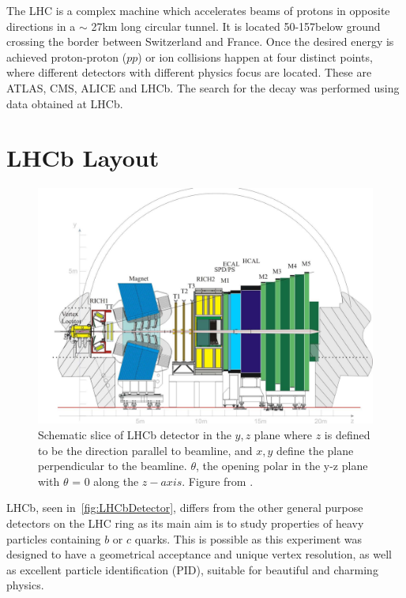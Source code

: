 The \Gls{LHC} is a complex machine which accelerates beams of protons in opposite directions in a $\sim$ 27km long circular tunnel. It is located
50-157\m below ground crossing the border between Switzerland and France. Once the desired energy is achieved proton-proton ($pp$) or ion collisions happen at four distinct points, where different detectors with different physics focus are located. These are \Gls{ATLAS}, \Gls{CMS}, \Gls{ALICE} and \Gls{LHCb}. 
The search for the decay \Bmumumu was performed using data obtained at \Gls{LHCb}\cite{det_paper}. 

\section{LHCb Layout }

\begin{figure}
	\centering
	\includegraphics[scale = 0.25]{figs/detector/lhcbdet.pdf}
	\caption{Schematic slice of \Gls{LHCb} detector in the $y,z$ plane where $z$ is defined to be the direction parallel to beamline, and $x,y$ define the plane perpendicular to the beamline. $\theta$, the opening polar in the y-z plane with $\theta$ = 0 along the $z-axis$. Figure from \cite{LHCbdetector}.}
	\label{fig:LHCbDetector}
\end{figure}


\Gls{LHCb}, seen in~\autoref{fig:LHCbDetector}, differs from the other general purpose detectors on the \Gls{LHC} ring as its main aim is to study properties of heavy particles containing $b$ or $c$ quarks. This is possible as this experiment was designed to have a geometrical acceptance and unique vertex resolution, as well as excellent particle identification (\Gls{PID}), suitable for beautiful and charming physics.

